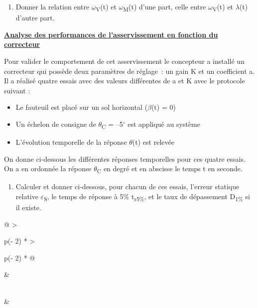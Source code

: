 \begin{enumerate}
\def\labelenumi{\arabic{enumi}.}
\setcounter{enumi}{2}
\item
  Donner la relation entre $\omega$\textsubscript{V}(t) et
  $\omega$\textsubscript{M}(t) d'une part, celle entre $\omega$\textsubscript{V}(t) et
  $\lambda$(t) d'autre part.
\end{enumerate}

\textbf{\ul{Analyse des performances de l'asservissement en fonction du
correcteur}}

Pour valider le comportement de cet asservissement le concepteur a
installé un correcteur qui possède deux paramètres de réglage~: un gain
K et un coefficient a. Il a réalisé quatre essais avec des valeurs
différentes de a et K avec le protocole suivant :

\begin{itemize}
\item
  Le fauteuil est placé sur un sol horizontal ($\beta$(t) = 0)
\item
  Un échelon de consigne de $\theta$\textsubscript{C} = --5$^\circ$ est appliqué au
  système
\item
  L'évolution temporelle de la réponse $\theta$(t) est relevée
\end{itemize}

On donne ci-dessous les différentes réponses temporelles pour ces quatre
essais. On a en ordonnée la réponse $\theta$\textsubscript{C} en degré et en
abscisse le temps t en seconde.

\begin{enumerate}
\def\labelenumi{\arabic{enumi}.}
\setcounter{enumi}{3}
\item
  Calculer et donner ci-dessous, pour chacun de ces essais, l'erreur
  statique relative $\varepsilon$\textsubscript{S}, le temps de réponse à 5\%
  t\textsubscript{r5\%}, et le taux de dépassement D\textsubscript{1\%}
  si il existe.
\end{enumerate}

\begin{longtable}[]{@{}
  >{\raggedright\arraybackslash}p{(\columnwidth - 2\tabcolsep) * }
  >{\raggedright\arraybackslash}p{(\columnwidth - 2\tabcolsep) * }@{}}
\toprule\noalign{}
\begin{minipage}[b]{\linewidth}\raggedright
{}
\end{minipage} & \begin{minipage}[b]{\linewidth}\raggedright
{}
\end{minipage} \\
\midrule\noalign{}
\endhead
\bottomrule\noalign{}
\endlastfoot
{} &
 \\
\end{longtable}

